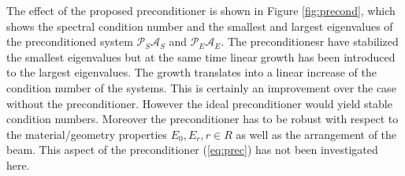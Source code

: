 \documentclass{marine_2015}
\begin{document}
The effect of the proposed preconditioner is shown in Figure \ref{fig:precond},
which shows the spectral condition number and the smallest and largest
eigenvalues of the preconditioned system $\mathcal{P}_S\mathcal{A}_S$ and 
$\mathcal{P}_E\mathcal{A}_E$. The preconditionesr have stabilized the smallest 
eigenvalues but at the same time linear growth has been introduced to the largest 
eigenvalues. The growth translates into a linear increase of the condition number 
of the systems. This is certainly an improvement over the case without the
preconditioner. However the ideal preconditioner would yield stable condition 
numbers. Moreover the preconditioner has to be robust with respect to the 
material/geometry properties $E_0, E_r, r\in R$ as well as the arrangement of
the beam. This aspect of the preconditioner (\ref{eq:prec}) has not been 
investigated here.
\end{document}
